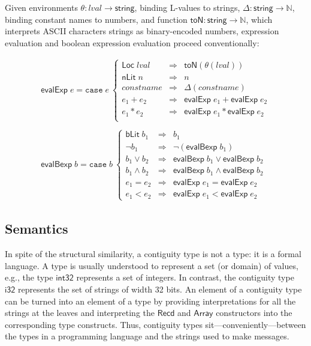 \documentclass[svgnames]{llncs}
\newcommand{\eg}{e.g.}
\newcommand{\konst}[1]{\ensuremath{\mathsf{#1}}}
\newcommand{\lval}{\ensuremath{\mathit{lval}}}
\begin{document}
Given environments $\theta: \mathit{lval} \to \konst{string}$, binding
L-values to strings, $\Delta : \konst{string} \to \mathbb{N}$, binding
constant names to numbers, and function
$\konst{toN}:\konst{string}\to\mathbb{N}$, which interprets ASCII
characters strings as binary-encoded numbers, expression evaluation
and boolean expression evaluation proceed conventionally:

\[
\begin{array}{l}
\konst{evalExp} \; e =
\mathtt{case}\; e\
 \left\{
 \begin{array}{lcl}
    \konst{Loc}\; \lval & \Rightarrow & \konst{toN}(\theta(\lval)) \\
    \konst{nLit}\; n & \Rightarrow & n  \\
    \mathit{constname} & \Rightarrow & \Delta(\mathit{constname})  \\
    e_1 + e_2 & \Rightarrow & \konst{evalExp}\; e_1 + \konst{evalExp}\; e_2  \\
    e_1 * e_2 & \Rightarrow & \konst{evalExp}\; e_1 * \konst{evalExp}\; e_2  \\
  \end{array}
 \right.
 \\ \\
\konst{evalBexp} \; b =
\mathtt{case}\; b\
 \left\{
 \begin{array}{lcl}
    \konst{bLit}\; b_1 & \Rightarrow & b_1 \\
    \neg b_1 & \Rightarrow & \neg(\konst{evalBexp} \; b_1)  \\
    b_1 \lor b_2 & \Rightarrow & \konst{evalBexp} \;b_1 \lor \konst{evalBexp} \;b_2   \\
    b_1 \land b_2 & \Rightarrow & \konst{evalBexp} \;b_1 \land \konst{evalBexp} \;b_2   \\
    e_1 = e_2 & \Rightarrow & \konst{evalExp} \;e_1 = \konst{evalExp} \;e_2   \\
    e_1 < e_2 & \Rightarrow & \konst{evalExp} \;e_1 < \konst{evalExp} \;e_2
  \end{array}
 \right.

\end{array}
\]




\subsection{Semantics}

In spite of the structural similarity, a contiguity type is not a
type: it is a formal language. A type is usually understood to
represent a set (or domain) of values, \eg, the type \konst{int32}
represents a set of integers. In contrast, the contiguity type
\konst{i32} represents the set of strings of width 32 bits. An element
of a contiguity type can be turned into an element of a type by
providing interpretations for all the strings at the leaves and
interpreting the \konst{Recd} and \konst{Array} constructors into the
corresponding type constructs. Thus, contiguity types
sit---conveniently---between the types in a programming language and
the strings used to make messages.
\end{document}

